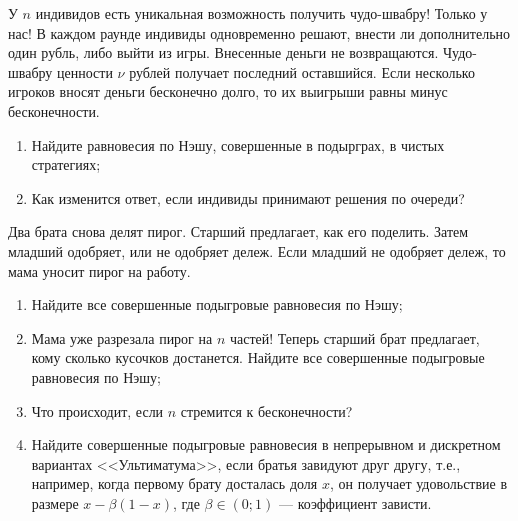 \begin{problem}[<<Лохотрон-??>>]
У  $n$  индивидов есть уникальная возможность получить чудо-швабру! Только у нас! В каждом раунде индивиды одновременно решают, внести ли дополнительно один рубль, либо выйти из игры. Внесенные деньги не возвращаются. Чудо-швабру ценности  $\nu $  рублей получает последний оставшийся. Если несколько игроков вносят деньги бесконечно долго, то их выигрыши равны минус бесконечности.\par
\begin{enumerate}
\item Найдите равновесия по Нэшу, совершенные в подырграх, в чистых стратегиях;\par
\item Как изменится ответ, если индивиды принимают решения по очереди?\par
\end{enumerate}


\begin{sol}

\end{sol}
\end{problem}



\begin{problem}[Ультиматум {[О]}]
Два брата снова делят пирог. Старший предлагает, как его поделить. Затем младший одобряет, или не одобряет дележ. Если младший не одобряет дележ, то мама уносит пирог на работу.\par
\begin{enumerate}
\item Найдите все совершенные подыгровые равновесия по Нэшу;\par
\item Мама уже разрезала пирог на  $n$  частей! Теперь старший брат предлагает, кому сколько кусочков достанется. Найдите все совершенные подыгровые равновесия по Нэшу;\par
\item  Что происходит, если  $n$  стремится к бесконечности?\par
\item Найдите совершенные подыгровые равновесия в непрерывном и дискретном вариантах <<Ультиматума>>, если братья завидуют друг другу, т.е., например, когда первому брату досталась доля  $x$, он получает удовольствие в размере  $x-\beta \left(1-x\right)$, где  $\beta \in \left(0;1\right)$  --- коэффициент зависти.
\end{enumerate}


\begin{sol}

\end{sol}
\end{problem}




